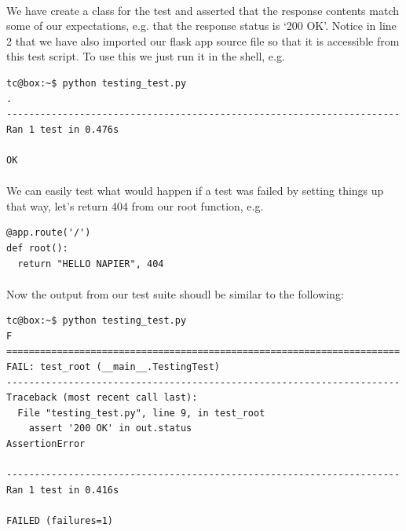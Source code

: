 \documentclass[12pt, a4paper, twoside]{book}
\begin{document}
\paragraph{} We have create a class for the test and asserted that the response contents match some of our expectations, e.g. that the response status is `200 OK'. Notice in line 2 that we have also imported our flask app source file so that it is accessible from this test script. To use this we just run it in the shell, e.g.

\begin{lstlisting}[style=DOS]
tc@box:~$ python testing_test.py 
.
----------------------------------------------------------------------
Ran 1 test in 0.476s

OK
\end{lstlisting}
\paragraph{} We can easily test what would happen if a test was failed by setting things up that way, let's return 404 from our root function, e.g.

\begin{lstlisting}
@app.route('/')
def root():
  return "HELLO NAPIER", 404
\end{lstlisting}

\paragraph{} Now the output from our test suite shoudl be similar to the following:

\begin{lstlisting}[style=DOS]
tc@box:~$ python testing_test.py 
F
======================================================================
FAIL: test_root (__main__.TestingTest)
----------------------------------------------------------------------
Traceback (most recent call last):
  File "testing_test.py", line 9, in test_root
    assert '200 OK' in out.status
AssertionError

----------------------------------------------------------------------
Ran 1 test in 0.416s

FAILED (failures=1)
\end{lstlisting}
\end{document}
